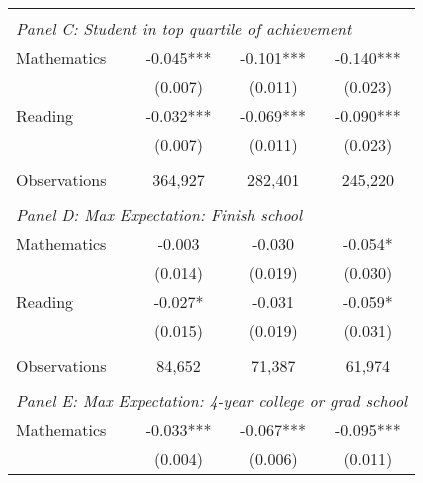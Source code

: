 {\begin{tabular}{lccc}
&  &  &   \\
\multicolumn{4}{l}{\textit{Panel C: Student in top quartile of achievement}} \\
\hspace{3mm}Mathematics&      -0.045***&      -0.101***&      -0.140***\\
                    &     (0.007)   &     (0.011)   &     (0.023)   \\
 
\hspace{3mm}Reading &      -0.032***&      -0.069***&      -0.090***\\
                    &     (0.007)   &     (0.011)   &     (0.023)   \\
                    &               &               &               \\
\hspace{3mm}Observations&     364,927   &     282,401   &     245,220   \\
 
&  &  &   \\
\multicolumn{4}{l}{\textit{Panel D: Max Expectation: Finish school}} \\
\hspace{3mm}Mathematics&      -0.003   &      -0.030   &      -0.054*  \\
                    &     (0.014)   &     (0.019)   &     (0.030)   \\
 
\hspace{3mm}Reading &      -0.027*  &      -0.031   &      -0.059*  \\
                    &     (0.015)   &     (0.019)   &     (0.031)   \\
                    &               &               &               \\
\hspace{3mm}Observations&      84,652   &      71,387   &      61,974   \\
 
&  &  &   \\
\multicolumn{4}{l}{\textit{Panel E: Max Expectation: 4-year college or grad school}} \\
\hspace{3mm}Mathematics&      -0.033***&      -0.067***&      -0.095***\\
                    &     (0.004)   &     (0.006)   &     (0.011)   \\
 

\end{tabular}}
